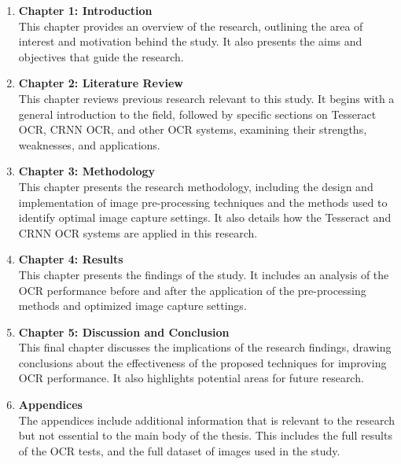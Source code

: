 \begin{enumerate}
      \item \textbf{Chapter 1: Introduction}\\
            This chapter provides an overview of the research, outlining the area of interest and motivation behind the study. It also presents the aims and objectives that guide the research.

      \item \textbf{Chapter 2: Literature Review}\\
            This chapter reviews previous research relevant to this study. It begins with a general introduction to the field, followed by specific sections on Tesseract OCR, CRNN OCR, and other OCR systems, examining their strengths, weaknesses, and applications.

      \item \textbf{Chapter 3: Methodology}\\
            This chapter presents the research methodology, including the design and implementation of image pre-processing techniques and the methods used to identify optimal image capture settings. It also details how the Tesseract and CRNN OCR systems are applied in this research.

      \item \textbf{Chapter 4: Results}\\
            This chapter presents the findings of the study. It includes an analysis of the OCR performance before and after the application of the pre-processing methods and optimized image capture settings.

      \item \textbf{Chapter 5: Discussion and Conclusion}\\
            This final chapter discusses the implications of the research findings, drawing conclusions about the effectiveness of the proposed techniques for improving OCR performance. It also highlights potential areas for future research.

      \item \textbf{Appendices}\\
            The appendices include additional information that is relevant to the research but not essential to the main body of the thesis. This includes the full results of the OCR tests, and the full dataset of images used in the study.
\end{enumerate}


